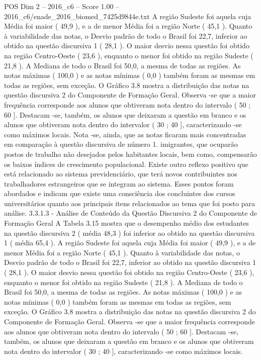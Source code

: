 \begin{textsample}{POS Dim 2 – 2016\_c6 – Score 1.00 – 2016\_c6/enade\_2016\_biomed\_7425d9844e.txt}
A região Sudeste foi aquela cuja Média foi maior ( 49,9 ), e a de menor Média foi a região Norte ( 45,1 ).
Quanto à variabilidade das notas, o Desvio padrão de todo o Brasil foi 22,7, inferior ao obtido na questão discursiva 1 ( 28,1 ).
O maior desvio nessa questão foi obtido na região Centro-Oeste ( 23,6 ), enquanto o menor foi obtido na região Sudeste ( 21,8 ).
A Mediana de todo o Brasil foi 50,0, a mesma de todas as regiões.
As notas máximas ( 100,0 ) e as notas mínimas ( 0,0 ) também foram as mesmas em todas as regiões, sem exceção.
O Gráfico 3.8 mostra a distribuição das notas na questão discursiva 2 do Componente de Formação Geral.
Observa -se que a maior frequência corresponde aos alunos que obtiveram nota dentro do intervalo ( 50 ; 60 ].
Destacam -se, também, os alunos que deixaram a questão em branco e os alunos que obtiveram nota dentro do intervalor ( 30 ; 40 ], caracterizando -se como máximos locais.
Nota -se, ainda, que as notas ficaram mais concentradas em comparação à questão discursiva de número 1. imigrantes, que ocuparão postos de trabalho não desejados pelos habitantes locais, bem como, compensarão os baixos índices de crescimento populacional.
Existe outro reflexo positivo que está relacionado ao sistema previdenciário, que terá novos contribuintes nos trabalhadores estrangeiros que se integram ao sistema.
Esses pontos foram abordados e indicam que existe uma consciência dos concluintes dos cursos universitários quanto aos principais itens relacionados ao tema que foi posto para análise. 3.3.1.3 - Análise de Conteúdo da Questão Discursiva 2 do Componente de Formação Geral A Tabela 3.15 mostra que o desempenho médio dos estudantes na questão discursiva 2 ( média 48,3 ) foi inferior ao obtido na questão discursiva 1 ( média 65,4 ).
A região Sudeste foi aquela cuja Média foi maior ( 49,9 ), e a de menor Média foi a região Norte ( 45,1 ).
Quanto à variabilidade das notas, o Desvio padrão de todo o Brasil foi 22,7, inferior ao obtido na questão discursiva 1 ( 28,1 ).
O maior desvio nessa questão foi obtido na região Centro-Oeste ( 23,6 ), enquanto o menor foi obtido na região Sudeste ( 21,8 ).
A Mediana de todo o Brasil foi 50,0, a mesma de todas as regiões.
As notas máximas ( 100,0 ) e as notas mínimas ( 0,0 ) também foram as mesmas em todas as regiões, sem exceção.
O Gráfico 3.8 mostra a distribuição das notas na questão discursiva 2 do Componente de Formação Geral.
Observa -se que a maior frequência corresponde aos alunos que obtiveram nota dentro do intervalo ( 50 ; 60 ].
Destacam -se, também, os alunos que deixaram a questão em branco e os alunos que obtiveram nota dentro do intervalor ( 30 ; 40 ], caracterizando -se como máximos locais.

\end{textsample}
